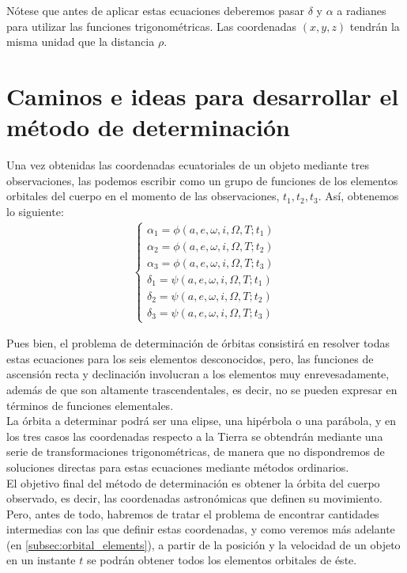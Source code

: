 Nótese que antes de aplicar estas ecuaciones deberemos pasar $\delta$ y $\alpha$ a radianes para utilizar las funciones trigonométricas. Las coordenadas $(x,y,z)$ tendrán la misma unidad que la distancia $\rho$.\\

\section{Caminos e ideas para desarrollar el método de determinación}
\label{sec:ideas_for_develope_method}
Una vez obtenidas las coordenadas ecuatoriales de un objeto mediante tres observaciones, las podemos escribir como un grupo de funciones de los elementos orbitales del cuerpo en el momento de las observaciones, $t_1, t_2, t_3$. Así, obtenemos lo siguiente:
\begin{align}
\left\{\begin{array}{l}
	\alpha_1 = \phi(a, e, \omega, i, \Omega, T; t_1)\\ 
	\alpha_2 = \phi(a, e, \omega, i, \Omega, T; t_2)\\ 
	\alpha_3 = \phi(a, e, \omega, i, \Omega, T; t_3)\\ 
	\delta_1 = \psi(a, e, \omega, i, \Omega, T; t_1)\\ 
	\delta_2 = \psi(a, e, \omega, i, \Omega, T; t_2)\\
	\delta_3 = \psi(a, e, \omega, i, \Omega, T; t_3)
\end{array}
\right.
\label{eq:ascension_declinacion}
\end{align}

Pues bien, el problema de determinación de órbitas consistirá en resolver todas estas ecuaciones para los seis elementos desconocidos, pero, las funciones de ascensión recta y declinación involucran a los elementos muy enrevesadamente, además de que son altamente trascendentales, es decir, no se pueden expresar en términos de funciones elementales.\\

La órbita a determinar podrá ser una elipse, una hipérbola o una parábola, y en los tres casos las coordenadas respecto a la Tierra se obtendrán mediante una serie de transformaciones trigonométricas, de manera que no dispondremos de soluciones directas para estas ecuaciones mediante métodos ordinarios.\\

El objetivo final del método de determinación es obtener la órbita del cuerpo observado, es decir, las coordenadas astronómicas que definen su movimiento. Pero, antes de todo, habremos de tratar el problema de encontrar cantidades intermedias con las que definir estas coordenadas, y como veremos más adelante (en \ref{subsec:orbital_elements}), a partir de la posición y la velocidad de un objeto en un instante $t$ se podrán obtener todos los elementos orbitales de éste.\\

